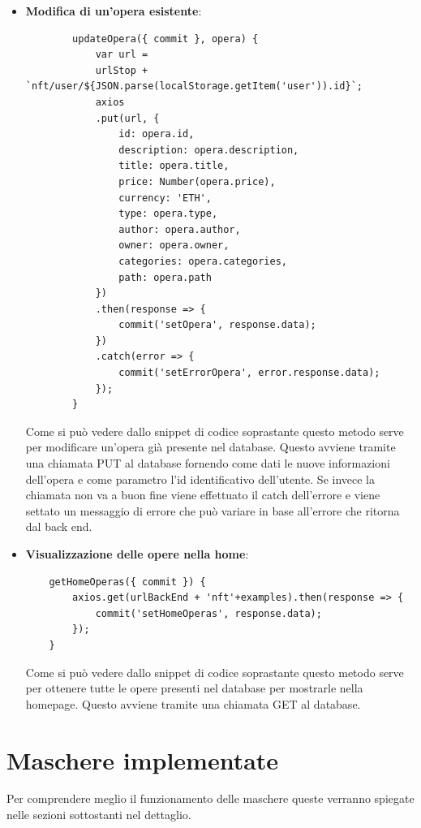 \begin{itemize}
	\item \textbf{Modifica di un'opera esistente}:
	\begin{lstlisting}
		updateOpera({ commit }, opera) {
			var url =
			urlStop + `nft/user/${JSON.parse(localStorage.getItem('user')).id}`;
			axios
			.put(url, {
				id: opera.id,
				description: opera.description,
				title: opera.title,
				price: Number(opera.price),
				currency: 'ETH',
				type: opera.type,
				author: opera.author,
				owner: opera.owner,
				categories: opera.categories,
				path: opera.path
			})
			.then(response => {
				commit('setOpera', response.data);
			})
			.catch(error => {
				commit('setErrorOpera', error.response.data);
			});
		}
	\end{lstlisting}
	Come si può vedere dallo snippet di codice soprastante questo metodo serve per modificare un'opera già presente nel database. Questo avviene tramite una chiamata PUT al database fornendo come dati le nuove informazioni dell'opera e come parametro l'id identificativo dell'utente. Se invece  la chiamata non va a buon fine viene effettuato il catch dell'errore e viene settato un messaggio di errore che può variare in base all'errore che ritorna dal back end.
		\item \textbf{Visualizzazione delle opere nella home}:
	\begin{lstlisting}
	getHomeOperas({ commit }) {
		axios.get(urlBackEnd + 'nft'+examples).then(response => {
			commit('setHomeOperas', response.data);
		});
	}
	\end{lstlisting}
	Come si può vedere dallo snippet di codice soprastante questo metodo serve per ottenere tutte le opere presenti nel database per mostrarle nella homepage. Questo avviene tramite una chiamata GET al database.
\end{itemize}

\section{Maschere implementate}

Per comprendere meglio il funzionamento delle maschere queste verranno spiegate nelle sezioni sottostanti nel dettaglio.

